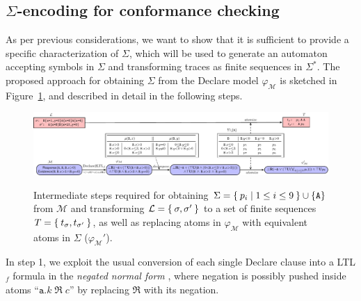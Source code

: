 

\subsection{$\Sigma$-encoding for conformance checking}\label{sec:dadtap}
As per previous considerations, we want to show that it is sufficient to provide a specific characterization of $\Sigma$, which will be used to generate an automaton accepting symbols in $\Sigma$ and transforming traces as finite sequences in $\Sigma^*$. The proposed approach for obtaining $\Sigma$ from the Declare model $\varphi_{\mathcal{M}}$ is sketched in Figure~\ref{fig:twoexamples}, and described in detail in the following steps.

\begin{figure}[!t]
	{\hspace{-1.3cm}\includegraphics[width=1.3\textwidth]{images/example_3}}
	\caption{Intermediate steps required for obtaining $\Sigma=\Set{p_i|1\leq i\leq 9}\cup\{\texttt{A}\}$ from $\mathcal{M}$ and transforming $\mathcal{L}=\Set{\sigma,\sigma'}$ to a set of finite sequences $T=\Set{t_\sigma,t_{\sigma'}}$, as well as replacing atoms in $\varphi_{\mathcal{M}}$ with equivalent atoms in $\Sigma$ ($\varphi_{\mathcal{M}}'$).}\label{fig:twoexamples}
\end{figure}
In step 1, we exploit the usual conversion of each single Declare clause into a LTL$_f$ formula in the \textit{negated normal form} \cite{LiPZVR20}, where negation is possibly pushed inside atoms ``$\texttt{a}.k\;\Re\; c$'' by replacing $\Re$ with its negation.

